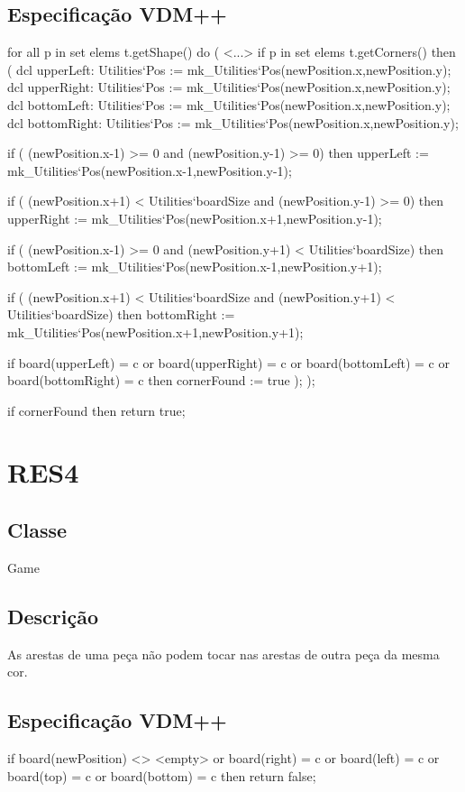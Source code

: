 \subsection{Especificação VDM++}
\begin{vdm_al}
  for all p in set elems t.getShape() do (
  <...>
    if p in set elems t.getCorners() then (
      dcl upperLeft: Utilities`Pos := mk_Utilities`Pos(newPosition.x,newPosition.y);
      dcl upperRight: Utilities`Pos := mk_Utilities`Pos(newPosition.x,newPosition.y);              
      dcl bottomLeft: Utilities`Pos := mk_Utilities`Pos(newPosition.x,newPosition.y);
      dcl bottomRight: Utilities`Pos := mk_Utilities`Pos(newPosition.x,newPosition.y);
  
      if ( (newPosition.x-1) >= 0 and (newPosition.y-1) >= 0) then
        upperLeft := mk_Utilities`Pos(newPosition.x-1,newPosition.y-1);
  
      if ( (newPosition.x+1)  < Utilities`boardSize and (newPosition.y-1) >= 0) then
        upperRight := mk_Utilities`Pos(newPosition.x+1,newPosition.y-1);
    
      if ( (newPosition.x-1) >= 0 and (newPosition.y+1) < Utilities`boardSize) then              
        bottomLeft := mk_Utilities`Pos(newPosition.x-1,newPosition.y+1);
    
      if ( (newPosition.x+1)  < Utilities`boardSize
    and (newPosition.y+1)  < Utilities`boardSize) then
        bottomRight := mk_Utilities`Pos(newPosition.x+1,newPosition.y+1);
  
      if board(upperLeft) = c or board(upperRight) = c or board(bottomLeft) = c or board(bottomRight) = c then
        cornerFound := true
      );
    );

    if cornerFound then
      return true;
\end{vdm_al}

\section{RES4}
\subsection{Classe}
Game
\subsection{Descrição}
As arestas de uma peça não podem tocar nas arestas de outra peça da mesma cor.
\subsection{Especificação VDM++}
\begin{vdm_al}
if board(newPosition) <> <empty> or board(right) = c or board(left) = c 
  or board(top) = c or board(bottom) = c then 
return false;
\end{vdm_al}

